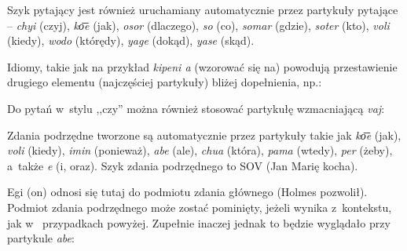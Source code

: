 \begin{spacing}{1.1}



Szyk pytający jest również uruchamiany automatycznie przez partykuły pytające -- 
\emph{chyi} (czyj), \emph{ko͞e} (jak), \emph{osor} (dlaczego), \emph{so} (co), 
\emph{somar} (gdzie), \emph{soter} (kto), \emph{voli} (kiedy), \emph{wodo} 
(którędy), \emph{yage} (dokąd), \emph{yase} (skąd).






Idiomy, takie jak na przykład \emph{kipeni a} (wzorować się na) powodują 
przestawienie drugiego elementu (najczęściej partykuły) bliżej dopełnienia, np.:



Do pytań w~stylu ,,czy'' można również stosować partykułę wzmacniającą \emph{vaj}:


Zdania podrzędne tworzone są automatycznie przez partykuły takie jak \emph{ko͞e} 
(jak), \emph{voli} (kiedy), \emph{imin} (ponieważ), \emph{abe} (ale), 
\emph{chua} (która), \emph{pama} (wtedy), \emph{per} (żeby), a~także \emph{e} 
(i, oraz). Szyk zdania podrzędnego to SOV (Jan Marię kocha).



Egi (on) odnosi się tutaj do podmiotu zdania głównego (Holmes pozwolił). Podmiot 
zdania podrzędnego może zostać pominięty, jeżeli wynika z~kontekstu, jak w~
przypadkach powyżej. Zupełnie inaczej jednak to będzie wyglądało przy partykule 
\emph{abe}:


\end{spacing}
